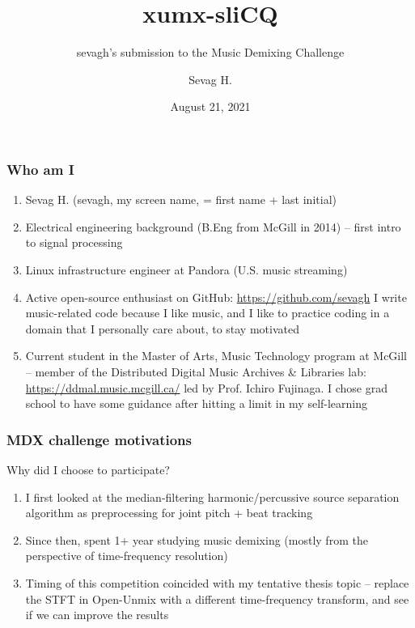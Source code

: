 \documentclass[usenames,dvipsnames]{beamer}
\title{xumx-sliCQ}
\subtitle{sevagh's submission to the Music Demixing Challenge}
\author{Sevag H.}
\date{August 21, 2021}
\begin{document}
\begin{frame}
\maketitle
\end{frame}

\begin{frame}
	\frametitle{Who am I}
	\begin{enumerate}
		\item
			Sevag H. (sevagh, my screen name, = first name + last initial)
		\item
			Electrical engineering background (B.Eng from McGill in 2014) -- first intro to signal processing
		\item
			Linux infrastructure engineer at Pandora (U.S. music streaming)
		\item
			Active open-source enthusiast on GitHub: \href{https://github.com/sevagh}{https://github.com/sevagh}
			I write music-related code because I like music, and I like to practice coding in a domain that I personally care about, to stay motivated
		\item
			Current student in the Master of Arts, Music Technology program at McGill -- member of the Distributed Digital Music Archives \& Libraries lab: \href{https://ddmal.music.mcgill.ca/}{https://ddmal.music.mcgill.ca/} led by Prof. Ichiro Fujinaga. I chose grad school to have some guidance after hitting a limit in my self-learning
	\end{enumerate}
\end{frame}

\begin{frame}
	\frametitle{MDX challenge motivations}
	Why did I choose to participate?
	\begin{enumerate}
		\item
			I first looked at the median-filtering harmonic/percussive source separation algorithm as preprocessing for joint pitch + beat tracking
		\item
			Since then, spent 1+ year studying music demixing (mostly from the perspective of time-frequency resolution)
		\item
			Timing of this competition coincided with my tentative thesis topic -- replace the STFT in Open-Unmix with a different time-frequency transform, and see if we can improve the results
	\end{enumerate}
\end{frame}
\end{document}
